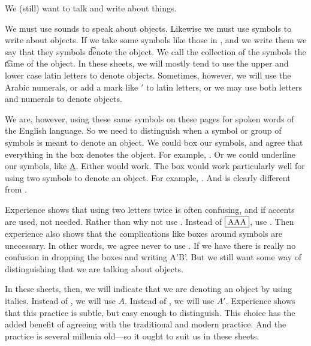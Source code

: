 

We (still) want to talk and write about things.


We must use sounds to speak about objects.
Likewise we must use symbols to write about objects.
If we take some symbols like those in , and we write them we say that they symbols \t{denote} the object.
We call the collection of the symbols the \t{name} of the object.
In these sheets, we will mostly tend to use the upper and lower case latin letters to denote objects.
Sometimes, however, we will use the Arabic numerals, or add a mark like $'$ to latin letters, or we may use both letters and numerals to denote objects.

We are, however, using these same symbols on these pages for spoken words of the English language.
So we need to distinguish when a symbol or group of symbols is meant to denote an object.
We could box our symbols, and agree that everything in the box denotes the object.
For example, .
Or we could underline our symbols, like \underline{A}.
Either would work.
The box would work particularly well for using two symbols to denote an object.
For example, .%
And  is clearly different from .

Experience shows that using two letters twice is often confusing, and if accents are used, not needed.
Rather than  why not use .
Instead of $\fbox{AAA}$, use .
Then experience also shows that the complications like boxes around symbols are unecessary.
In other words, we agree never to use .
If we have  there is really no confusion in dropping the boxes and writing A'B'.
But we still want some way of distinguishing that we are talking about objects.

In these sheets, then, we will indicate that we are denoting an object by using italics.
Instead of , we will use $A$.
Instead of , we will use $A'$.
Experience shows that this practice is subtle, but easy enough to distinguish.
This choice has the added benefit of agreeing with the traditional and modern practice.
And the practice is several millenia old---so it ought to suit us in these sheets.

